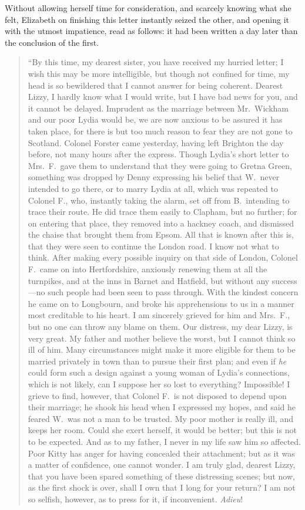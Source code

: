 \documentclass[12pt,english,oneside]{book}
\begin{document}
Without allowing herself time for consideration, and scarcely knowing
what she felt, Elizabeth on finishing this letter instantly seized
the other, and opening it with the utmost impatience, read as follows:
it had been written a day later than the conclusion of the first.

\begin{quotation}{}``By this time, my dearest sister, you have received
my hurried letter; I wish this may be more intelligible, but though
not confined for time, my head is so bewildered that I cannot answer
for being coherent. Dearest Lizzy, I hardly know what I would write,
but I have bad news for you, and it cannot be delayed. Imprudent as
the marriage between Mr.\ Wickham and our poor Lydia would be, we
are now anxious to be assured it has taken place, for there is but
too much reason to fear they are not gone to Scotland. Colonel Forster
came yesterday, having left Brighton the day before, not many hours
after the express. Though Lydia's short letter to Mrs.\ F.\ gave
them to understand that they were going to Gretna Green, something
was dropped by Denny expressing his belief that W.\ never intended
to go there, or to marry Lydia at all, which was repeated to Colonel
F., who, instantly taking the alarm, set off from B.\ intending to
trace their route. He did trace them easily to Clapham, but no further;
for on entering that place, they removed into a hackney coach, and
dismissed the chaise that brought them from Epsom. All that is known
after this is, that they were seen to continue the London road. I
know not what to think. After making every possible inquiry on that
side of London, Colonel F.\ came on into Hertfordshire, anxiously
renewing them at all the turnpikes, and at the inns in Barnet and
Hatfield, but without any success\mbox{---}no such people had been
seen to pass through. With the kindest concern he came on to Longbourn,
and broke his apprehensions to us in a manner most creditable to his
heart. I am sincerely grieved for him and Mrs.\ F., but no one can
throw any blame on them. Our distress, my dear Lizzy, is very great.
My father and mother believe the worst, but I cannot think so ill
of him. Many circumstances might make it more eligible for them to
be married privately in town than to pursue their first plan; and
even if \textit{he} could form such a design against a young woman
of Lydia's connections, which is not likely, can I suppose her so
lost to everything? Impossible! I grieve to find, however, that Colonel
F.\ is not disposed to depend upon their marriage; he shook his head
when I expressed my hopes, and said he feared W.\ was not a man to
be trusted. My poor mother is really ill, and keeps her room. Could
she exert herself, it would be better; but this is not to be expected.
And as to my father, I never in my life saw him so affected. Poor
Kitty has anger for having concealed their attachment; but as it was
a matter of confidence, one cannot wonder. I am truly glad, dearest
Lizzy, that you have been spared something of these distressing scenes;
but now, as the first shock is over, shall I own that I long for your
return? I am not so selfish, however, as to press for it, if inconvenient.
\emph{Adieu}! 


\end{quotation}
\end{document}

